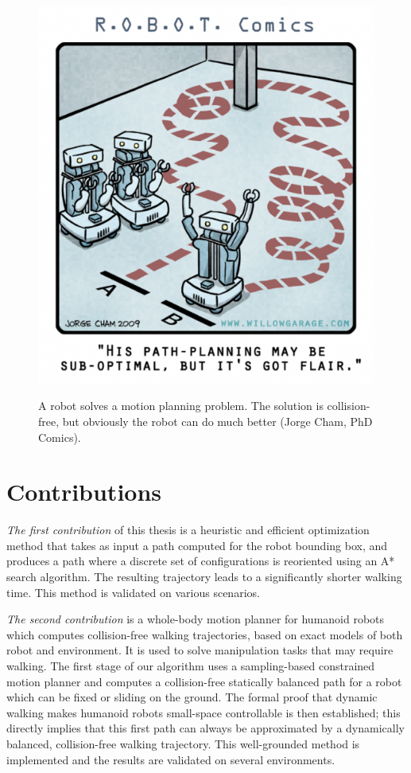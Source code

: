 \begin{figure}[h!]
  \centering
      {\includegraphics[width = 0.6\linewidth]
        {src/chap0-introduction/optimal-motion-planning.png}}
      \caption{A robot solves a motion planning problem. The solution
        is collision-free, but obviously the robot can do much better
        (Jorge Cham, PhD Comics).}
      \label{fig:chap0-optimal-motion-planning}
\end{figure}

\section*{Contributions}

\emph{The first contribution} of this thesis is a heuristic and
efficient optimization method that takes as input a path computed for
the robot bounding box, and produces a path where a discrete set of
configurations is reoriented using an A* search algorithm. The
resulting trajectory leads to a significantly shorter walking
time. This method is validated on various scenarios.

\emph{The second contribution} is a whole-body motion planner for
humanoid robots which computes collision-free walking trajectories,
based on exact models of both robot and environment. It is used to
solve manipulation tasks that may require walking. The first stage of
our algorithm uses a sampling-based constrained motion planner and
computes a collision-free statically balanced path for a robot which
can be fixed or sliding on the ground. The formal proof that dynamic
walking makes humanoid robots small-space controllable is then
established; this directly implies that this first path can always be
approximated by a dynamically balanced, collision-free walking
trajectory. This well-grounded method is implemented and the results
are validated on several environments.


